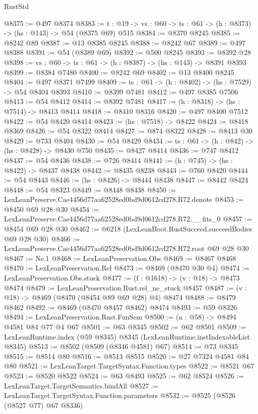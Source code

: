 \begin{lexlean}{RustStd}
\begin{coremodule}
@8375 := @497 @8374
@8383 := {t : @19} -> {vs : @60} -> {ts : @61} -> (h : @8373) -> (hs : @143) -> @54 (@8375 @69) @515
@8384 := @8370 @8245
@8385 := @8242 @89
@8387 := @13 @8385 @8245
@8388 := @8242 @67
@8389 := @497 @8388
@8391 := @54 (@8389 @69)
@8392 := @500 @8245
@8393 := @8392 @28
@8398 := {vs : @60} -> {ts : @61} -> (h : @8387) -> (hs : @143) -> @8391 @8393
@8399 := @8384 @7480
@8400 := @8242 @69
@8402 := @13 @8400 @8245
@8404 := @497 @8371 @7499
@8409 := {ts : @61} -> (h : @8402) -> (hs : @7529) -> @54 @8404 @8393
@8410 := @8399 @7481
@8412 := @497 @8385 @7506
@8413 := @54 @8412
@8414 := @8392 @7481
@8417 := (h : @8318) -> (hs : @7514) -> @8413 @8414
@8418 := @8410 @8316
@8420 := @497 @8400 @7512
@8422 := @54 @8420 @8414
@8423 := (hs : @7518) -> @8422
@8424 := @8418 @8369
@8426 := @54 @8322 @8414
@8427 := @874 @8322
@8428 := @8413 @30
@8429 := @733 @8404
@8430 := @54 @8429
@8434 := {ts : @61} -> (h : @842) -> (hs : @8428) -> @8430 @750
@8435 := @8427 @8414
@8436 := @747 @8412
@8437 := @54 @8436
@8438 := @726 @8414
@8441 := (h : @745) -> (hs : @8422) -> @8437 @8438
@8442 := @8435 @8238
@8443 := @760 @8420
@8444 := @54 @8443
@8446 := (hs : @8426) -> @8444 @8438
@8447 := @8442 @8424
@8448 := @54 @8323
@8449 := @8448 @8438
@8450 := LexLeanPreserve.Cae4456d77aa62528ed0bd9d0612cd278.R72.denote
@8453 := @8450 @69 @28 @30
@8454 := LexLeanPreserve.Cae4456d77aa62528ed0bd9d0612cd278.R72.__fits_0
@8457 := @8454 @69 @28 @30
@8462 := @6218 (LexLeanBoot.RustSucceed.succeedBodies @69 @28 @30)
@8466 := LexLeanPreserve.Cae4456d77aa62528ed0bd9d0612cd278.R72.root @69 @28 @30
@8467 := Ne.{1}
@8468 := LexLeanPreservation.Obs
@8469 := @8467 @8468
@8470 := LexLeanPreservation.Rel
@8473 := @8469 (@8470 @30 @4)
@8474 := LexLeanPreservation.Obs.stuck
@8477 := (f : @1618) -> (v : @18) -> @8473 @8474
@8479 := LexLeanPreservation.Rust.rel_ne_stuck @8457
@8487 := (v : @18) -> @8469 (@8470 (@8454 @89 @69 @28) @4) @8474
@8488 := @8479 @8462
@8492 := @8469 (@8470 @8457 @8462) @8474
@8493 := @59 @8326
@8494 := LexLeanPreservation.Rust.FunSem
@8500 := (n : @58) -> @8494 @4581 @84 @77 @4 @67
@8501 := @63 @8345
@8502 := @62 @8501
@8509 := LexLeanRuntime.index (@59 @8345) @8345 (LexLeanRuntime.instIndexableList @8345)
@8513 := @8502 (@8509 (@8346 @4581) @67)
@8514 := @73 @8345
@8515 := @8514 @80
@8516 := @8513 @8515
@8520 := @27 @7324 @4581 @84 @80
@8521 := LexLeanTarget.TargetSyntax.Function.types
@8522 := @8521 @67
@8523 := @8520 @8522
@8524 := @63 @8493
@8525 := @62 @8524
@8526 := LexLeanTarget.TargetSemantics.bindAll
@8527 := LexLeanTarget.TargetSyntax.Function.parameters
@8532 := @8525 (@8526 (@8527 @77) @67 @8336)

\end{coremodule}
\end{lexlean}

